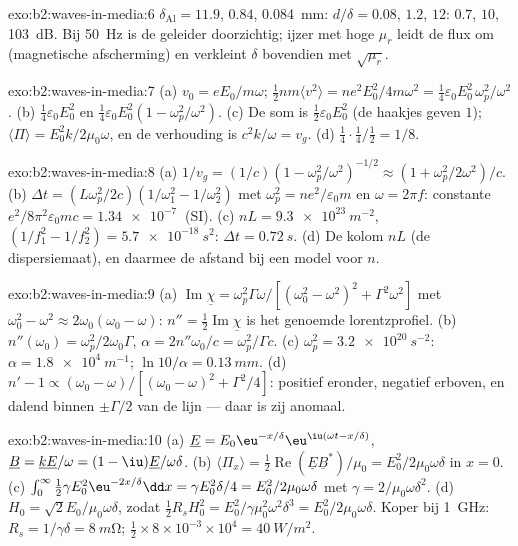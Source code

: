 \begin{solution}{exo:b2:waves-in-media:6}
$\delta_{\text{Al}} = 11.9$, $0.84$, \qty{0.084}{mm}: $d/\delta = 0.08$,
$1.2$, $12$: $0.7$, $10$, \qty{103}{dB}. Bij \qty{50}{Hz} is de geleider
doorzichtig; ijzer met hoge $\mu_r$ leidt de flux om (magnetische
afscherming) en verkleint $\delta$ bovendien met $\sqrt{\mu_r}$.
\end{solution}

\begin{solution}{exo:b2:waves-in-media:7}
(a) $v_0 = eE_0/m\omega$;
$\tfrac12nm\langle v^2\rangle = ne^2E_0^2/4m\omega^2 = \tfrac14\varepsilon_0
E_0^2\,\omega_p^2/\omega^2$.
(b) $\tfrac14\varepsilon_0E_0^2$ en
$\tfrac14\varepsilon_0E_0^2(1 - \omega_p^2/
\omega^2)$. (c) De som is
$\tfrac12\varepsilon_0E_0^2$ (de haakjes geven $1$);
$\langle\Pi
\rangle = E_0^2k/2\mu_0\omega$, en de verhouding is
$c^2k/\omega = v_g$. (d) $\tfrac14\cdot\tfrac14
/\tfrac12 = 1/8$.
\end{solution}

\begin{solution}{exo:b2:waves-in-media:8}
(a)
$1/v_g = (1/c)(1 - \omega_p^2/\omega^2)^{-1/2} \approx (1 + \omega_p^2/2\omega^2)/c$.
(b) $\Delta t
= (L\omega_p^2/2c)(1/\omega_1^2 - 1/\omega_2^2)$ met
$\omega_p^2 = ne^2/\varepsilon_0m$ en $\omega =
2\pi f$: constante
$e^2/8\pi^2\varepsilon_0mc = \qty{1.34e-7}{}$ (SI). (c)
$nL = \qty{9.3e23}{m^{-2}}$, $(1/f_1^2 - 1/f_2^2) = \qty{5.7e-18}{s^2}$:
$\Delta t = \qty{0.72}{s}$. (d) De kolom $nL$ (de dispersiemaat), en daarmee
de afstand bij een model voor $n$.
\end{solution}

\begin{solution}{exo:b2:waves-in-media:9}
(a)
$\operatorname{Im}\underline\chi = \omega_p^2\Gamma\omega/[(\omega_0^2 - \omega^2)^2 + \Gamma^2\omega^2]$
met $\omega_0^2 - \omega^2 \approx 2\omega_0(\omega_0 - \omega)$:
$n'' = \tfrac12\operatorname{Im}\underline\chi$ is het genoemde
lorentzprofiel. (b) $n''(\omega_0) = \omega_p^2/2\omega_0\Gamma$,
$\alpha = 2n''\omega_0/c =
\omega_p^2/\Gamma c$. (c)
$\omega_p^2 = \qty{3.2e20}{s^{-2}}$: $\alpha = \qty{1.8e4}{m^{-1}}$;
$\ln10/\alpha = \qty{0.13}{mm}$. (d)
$n' - 1 \propto (\omega_0 - \omega)/[(\omega_0 - \omega)^2 +
\Gamma^2/4]$:
positief eronder, negatief erboven, en dalend binnen $\pm\Gamma/2$ van de
lijn --- daar is zij anomaal.
\end{solution}

\begin{solution}{exo:b2:waves-in-media:10}
(a) $\underline E = E_0\eu^{-x/\delta}\eu^{\iu(\omega t - x/\delta)}$,
$\underline B = \underline k\underline E/\omega
= (1 - \iu)\underline E/\omega\delta$.
(b)
$\langle\Pi_x\rangle = \tfrac12\operatorname{Re}(\underline E
\underline B^*)/\mu_0 = E_0^2/2\mu_0\omega\delta$
in $x = 0$. (c)
$\int_0^\infty\tfrac12\gamma E_0^2
\eu^{-2x/\delta}\dd x = \gamma E_0^2\delta/4 = E_0^2/2\mu_0\omega\delta$
met $\gamma = 2/\mu_0\omega\delta^2$. (d)
$H_0 = \sqrt2E_0/\mu_0\omega\delta$, zodat
$\tfrac12R_sH_0^2 = E_0^2/\gamma\mu_0^2\omega^2\delta^3 =
E_0^2/2\mu_0\omega\delta$.
Koper bij \qty{1}{GHz}: $R_s = 1/\gamma\delta = \qty{8}{m\ohm}$;
$\tfrac12 \times 8 \times 10^{-3} \times 10^4 = \qty{40}{W/m^2}$.
\end{solution}

